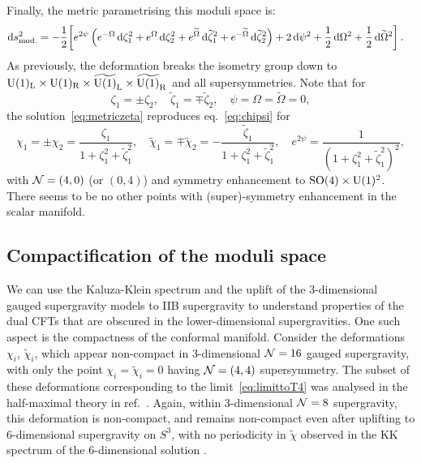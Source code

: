 \documentclass[a4paper, 11pt]{article}
\numberwithin{equation}{section}
\newcommand{\ts}[1]{\widetilde{#1}}
\newcommand{\+}{\oplus}
\renewcommand{\d}{\ensuremath{\mathrm{d}}\xspace}
\begin{document}
Finally, the metric parametrising this moduli space is:
\begin{equation}
	\begin{aligned}
		\d s^{2}_{\rm mod.} &= -\frac{1}{2}\bigg[e^{2\psi}\left(e^{-\Omega}\,\d\zeta_{1}^{2}+e^{\Omega}\,\d\zeta_{2}^{2}+e^{\ts{\Omega}}\,\d\ts{\zeta}_{1}^{2}+e^{-\ts{\Omega}}\,\d\ts{\zeta}_{2}^{2}\right) +2\,\d\psi^{2} + \frac{1}{2}\,\d\Omega^{2}+ \frac{1}{2}\,\d\ts{\Omega}^{2}\bigg]\,.
	\end{aligned}
\end{equation}
As previously, the deformation breaks the isometry group down to ${\rm U}(1)_{\rm L}\times{\rm U}(1)_{\rm R}\times\ts{{\rm U}(1)}_{\rm L}\times\ts{{\rm U}(1)}_{\rm R}$ and all supersymmetries. Note that for
\begin{equation}
	\zeta_{1}=\pm\zeta_{2},\quad \ts{\zeta}_{1}=\mp\ts{\zeta}_{2},\quad\psi=\Omega=\ts{\Omega}=0,
\end{equation}
the solution~\eqref{eq:metriczeta} reproduces eq.~\eqref{eq:chipsi} for
\begin{equation}
	\chi_{1}=\pm\chi_{2}=\frac{\zeta_{1}}{1+\zeta_{1}^{2}+\ts{\zeta}_{1}^{2}},\quad \ts{\chi}_{1}=\mp\ts{\chi}_{2}=-\frac{\ts{\zeta}_{1}}{1+\zeta_{1}^{2}+\ts{\zeta}_{1}^{2}},\quad e^{2\psi}=\frac{1}{(1+\zeta_{1}^{2}+\ts{\zeta}_{1}^{2})^{2}},
\end{equation}
with ${\cal N}=(4,0)$ (or $(0,4)$) and symmetry enhancement to ${\rm SO}(4)\times{\rm U}(1)^{2}$. There seems to be no other points with (super)-symmetry enhancement in the scalar manifold.

\subsection{Compactification of the moduli space} \label{s:Compact}

We can use the Kaluza-Klein spectrum and the uplift of the 3-dimensional gauged supergravity models to IIB supergravity to understand properties of the dual CFTs that are obscured in the lower-dimensional supergravities. One such aspect is the compactness of the conformal manifold. Consider the deformations $\chi_i$, $\ts{\chi}_i$, which appear non-compact in 3-dimensional ${\cal N}=16$ gauged supergravity, with only the point $\chi_i = \ts{\chi}_i = 0$ having ${\cal N}=(4,4)$ supersymmetry. The subset of these deformations corresponding to the limit~\eqref{eq:limittoT4} was analysed in the half-maximal theory in ref.~\cite{Eloy:2021fhc}. Again, within 3-dimensional ${\cal N}=8$ supergravity, this deformation is non-compact, and remains non-compact even after uplifting to 6-dimensional supergravity on $S^3$, with no periodicity in $\ts{\chi}$ observed in the KK spectrum of the 6-dimensional solution \cite{Eloy:2021fhc}.
\end{document}
